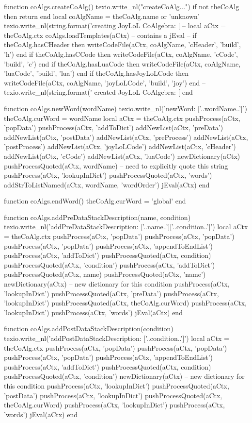 function coAlgs.createCoAlg()
  texio.write_nl("createCoAlg...")
  if not theCoAlg then return end
  local coAlgName = theCoAlg.name or 'unknown'
  texio.write_nl(string.format('creating JoyLoL CoAlgebra: [%
  --
  local aCtx = theCoAlg.ctx
  coAlgs.loadTemplates(aCtx) -- contains a jEval
  --
  if theCoAlg.hasCHeader    then writeCodeFile(aCtx, coAlgName, 'cHeader',    'build', 'h')   end
  if theCoAlg.hasCCode      then writeCodeFile(aCtx, coAlgName, 'cCode',      'build', 'c')   end
  if theCoAlg.hasLuaCode    then writeCodeFile(aCtx, coAlgName, 'luaCode',    'build', 'lua') end
  if theCoAlg.hasJoyLoLCode then writeCodeFile(aCtx, coAlgName, 'joyLoLCode', 'build', 'joy') end
  --
  texio.write_nl(string.format(' created JoyLoL CoAlgebra: [%
end

function coAlgs.newWord(wordName)
  texio.write_nl('newWord: ['..wordName..']')
  theCoAlg.curWord    = wordName
  local aCtx = theCoAlg.ctx
  pushProcess(aCtx, 'popData')
  pushProcess(aCtx, 'addToDict')
  addNewList(aCtx, 'preData')
  addNewList(aCtx, 'postData')
  addNewList(aCtx, 'preProcess')
  addNewList(aCtx, 'postProcess')
  addNewList(aCtx, 'joyLoLCode')
  addNewList(aCtx, 'cHeader')
  addNewList(aCtx, 'cCode')
  addNewList(aCtx, 'luaCode')
  newDictionary(aCtx)
  pushProcessQuoted(aCtx, wordName) -- need to explicitly quote this string
  pushProcess(aCtx, 'lookupInDict')
  pushProcessQuoted(aCtx, 'words')
  addStrToListNamed(aCtx, wordName, 'wordOrder')
  jEval(aCtx)
end

function coAlgs.endWord()
  theCoAlg.curWord = 'global'
end

function coAlgs.addPreDataStackDescription(name, condition)
  texio.write_nl('addPreDataStackDescription: ['..name..']['..condition..']')
  local aCtx = theCoAlg.ctx
  pushProcess(aCtx, 'popData')
  pushProcess(aCtx, 'popData')
  pushProcess(aCtx, 'popData')
  pushProcess(aCtx, 'appendToEndList')
  pushProcess(aCtx, 'addToDict')
  pushProcessQuoted(aCtx, condition)
  pushProcessQuoted(aCtx, 'condition')
  pushProcess(aCtx, 'addToDict')
  pushProcessQuoted(aCtx, name)
  pushProcessQuoted(aCtx, 'name')
  newDictionary(aCtx) -- new dictionary for this condition
  pushProcess(aCtx, 'lookupInDict')
  pushProcessQuoted(aCtx, 'preData')
  pushProcess(aCtx, 'lookupInDict')
  pushProcessQuoted(aCtx, theCoAlg.curWord)
  pushProcess(aCtx, 'lookupInDict')
  pushProcess(aCtx, 'words')
  jEval(aCtx)
end

function coAlgs.addPostDataStackDescription(condition)
  texio.write_nl('addPostDataStackDescription: ['..condition..']')
  local aCtx = theCoAlg.ctx
  pushProcess(aCtx, 'popData')
  pushProcess(aCtx, 'popData')
  pushProcess(aCtx, 'popData')
  pushProcess(aCtx, 'appendToEndList')
  pushProcess(aCtx, 'addToDict')
  pushProcessQuoted(aCtx, condition)
  pushProcessQuoted(aCtx, 'condition')
  newDictionary(aCtx) -- new dictionary for this condition
  pushProcess(aCtx, 'lookupInDict')
  pushProcessQuoted(aCtx, 'postData')
  pushProcess(aCtx, 'lookupInDict')
  pushProcessQuoted(aCtx, theCoAlg.curWord)
  pushProcess(aCtx, 'lookupInDict')
  pushProcess(aCtx, 'words')
  jEval(aCtx)
end

